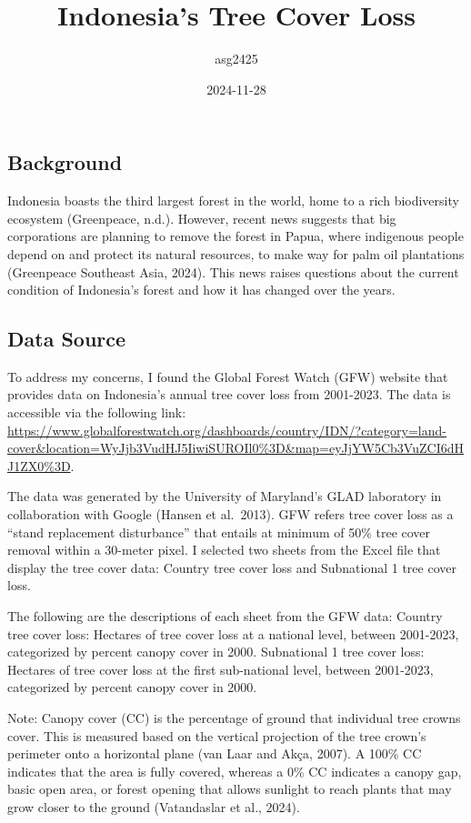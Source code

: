 \documentclass[
]{article}
\title{Indonesia's Tree Cover Loss}
\author{asg2425}
\date{2024-11-28}
\begin{document}
\maketitle

\subsection{Background}\label{background}

Indonesia boasts the third largest forest in the world, home to a rich
biodiversity ecosystem (Greenpeace, n.d.). However, recent news suggests
that big corporations are planning to remove the forest in Papua, where
indigenous people depend on and protect its natural resources, to make
way for palm oil plantations (Greenpeace Southeast Asia, 2024). This
news raises questions about the current condition of Indonesia's forest
and how it has changed over the years.

\subsection{Data Source}\label{data-source}

To address my concerns, I found the Global Forest Watch (GFW) website
that provides data on Indonesia's annual tree cover loss from 2001-2023.
The data is accessible via the following link:
\url{https://www.globalforestwatch.org/dashboards/country/IDN/?category=land-cover&location=WyJjb3VudHJ5IiwiSUROIl0\%3D&map=eyJjYW5Cb3VuZCI6dHJ1ZX0\%3D}.

The data was generated by the University of Maryland's GLAD laboratory
in collaboration with Google (Hansen et al.~2013). GFW refers tree cover
loss as a ``stand replacement disturbance'' that entails at minimum of
50\% tree cover removal within a 30-meter pixel. I selected two sheets
from the Excel file that display the tree cover data: Country tree cover
loss and Subnational 1 tree cover loss.

The following are the descriptions of each sheet from the GFW data:
Country tree cover loss: Hectares of tree cover loss at a national
level, between 2001-2023, categorized by percent canopy cover in 2000.
Subnational 1 tree cover loss: Hectares of tree cover loss at the first
sub-national level, between 2001-2023, categorized by percent canopy
cover in 2000.

Note: Canopy cover (CC) is the percentage of ground that individual tree
crowns cover. This is measured based on the vertical projection of the
tree crown's perimeter onto a horizontal plane (van Laar and Akça,
2007). A 100\% CC indicates that the area is fully covered, whereas a
0\% CC indicates a canopy gap, basic open area, or forest opening that
allows sunlight to reach plants that may grow closer to the ground
(Vatandaslar et al., 2024).
\end{document}
